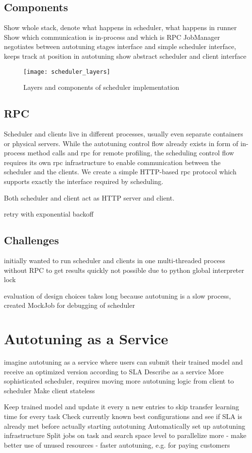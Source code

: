 \subsection{Components}
Show whole stack, denote what happens in scheduler, what happens in runner
Show which communication is in-process and which is RPC
JobManager negotiates between autotuning stages interface and simple scheduler interface, keeps track at position in autotuning
show abstract scheduler and client interface

\begin{figure}[ht]
	\centering
	\texttt{[image: scheduler\_layers]}%
	\caption{Layers and components of scheduler implementation}
	\label{fig:scheduler_layers}
\end{figure}

\subsection{RPC}
Scheduler and clients live in different processes, usually even separate containers or physical servers. While the autotuning control flow already exists in form of in-process method calls and \gls{rpc} for remote profiling, the scheduling control flow requires its own \gls{rpc} infrastructure to enable communication between the scheduler and the clients. We create a simple HTTP-based \gls{rpc} protocol which supports exactly the interface required by scheduling.

Both scheduler and client act as HTTP server and client.

retry with exponential backoff

\subsection{Challenges}
initially wanted to run scheduler and clients in one multi-threaded process without RPC to get results quickly
not possible due to python global interpreter lock

evaluation of design choices takes long because autotuning is a slow process, created MockJob for debugging of scheduler

\section{Autotuning as a Service}
imagine autotuning as a service where users can submit their trained model and receive an optimized version according to SLA
Describe as a service
More sophisticated scheduler, requires moving more autotuning logic from client to scheduler
Make client stateless

Keep trained model and update it every n new entries to skip transfer learning time for every task
Check currently known best configurations and see if SLA is already met before actually starting autotuning
Automatically set up autotuning infrastructure
Split jobs on task and search space level to parallelize more
- make better use of unused resources
- faster autotuning, e.g. for paying customers